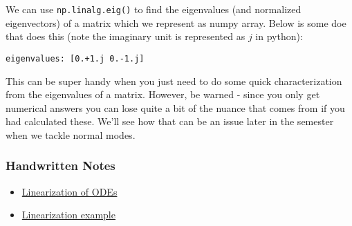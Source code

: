 We can use \texttt{np.linalg.eig()} to find the eigenvalues (and
normalized eigenvectors) of a matrix which we represent as numpy array.
Below is some doe that does this (note the imaginary unit is represented
as \(j\) in python):

\begin{Shaded}
\begin{Highlighting}[]
\OperatorTok{=}\NormalTok{ np.array([[}\NormalTok{,}\NormalTok{],[}\OperatorTok{{-}}\NormalTok{,}\NormalTok{]])}
\OperatorTok{=}\NormalTok{ np.linalg.eig(A)[}\NormalTok{]}
\OperatorTok{=}\NormalTok{ np.linalg.eig(A)[}\NormalTok{]}

\NormalTok{(}
\end{Highlighting}
\end{Shaded}

\begin{verbatim}
eigenvalues: [0.+1.j 0.-1.j]
\end{verbatim}

This can be super handy when you just need to do some quick
characterization from the eigenvalues of a matrix. However, be warned -
since you only get numerical answers you can lose quite a bit of the
nuance that comes from if you had calculated these. We'll see how that
can be an issue later in the semester when we tackle normal modes.

\subsubsection{Handwritten Notes}\label{handwritten-notes}

\begin{itemize}
\tightlist
\item
  \href{../../assets/notes/Notes-Linearization_ODEs.pdf}{Linearization
  of ODEs}
\item
  \href{../../assets/notes/Notes-Linearization_Example.pdf}{Linearization
  example}
\end{itemize}
